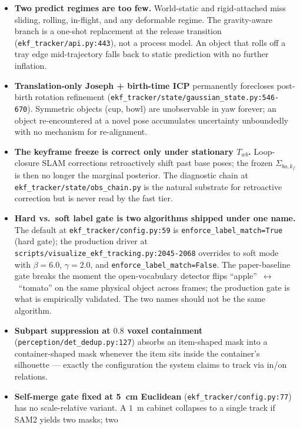 \documentclass[11pt]{article}
\begin{document}
\begin{itemize}[leftmargin=1.5em,itemsep=0pt,topsep=2pt]
\item \textbf{Two predict regimes are too few.} World-static and
  rigid-attached miss sliding, rolling, in-flight, and any deformable
  regime. The gravity-aware branch is a one-shot replacement at the
  release transition (\texttt{ekf\_tracker/api.py:443}), not a process
  model. An object that rolls off a tray edge mid-trajectory falls back
  to static prediction with no further inflation.
\item \textbf{Translation-only Joseph + birth-time ICP} permanently
  forecloses post-birth rotation refinement
  (\texttt{ekf\_tracker/state/gaussian\_state.py:546-670}).
  Symmetric objects (cup, bowl) are unobservable in yaw forever; an object
  re-encountered at a novel pose accumulates uncertainty unboundedly with
  no mechanism for re-alignment.
\item \textbf{The keyframe freeze is correct only under stationary
  $T_{wb}$.} Loop-closure SLAM corrections retroactively shift past base
  poses; the frozen $\Sigma_{bo,k_f}$ is then no longer the marginal
  posterior. The diagnostic chain at
  \texttt{ekf\_tracker/state/obs\_chain.py} is the natural substrate for
  retroactive correction but is never read by the fast tier.
\item \textbf{Hard vs.\ soft label gate is two algorithms shipped under
  one name.} The default at \texttt{ekf\_tracker/config.py:59} is
  \texttt{enforce\_label\_match=True} (hard gate); the production driver
  at \texttt{scripts/visualize\_ekf\_tracking.py:2045-2068} overrides to
  soft mode with $\beta{=}6.0$, $\gamma{=}2.0$, and
  \texttt{enforce\_label\_match=False}. The paper-baseline gate breaks the
  moment the open-vocabulary detector flips ``apple''~$\leftrightarrow$~``tomato''
  on the same physical object across frames; the production gate is what
  is empirically validated. The two names should not be the same algorithm.
\item \textbf{Subpart suppression at $0.8$ voxel containment}
  (\texttt{perception/det\_dedup.py:127}) absorbs an item-shaped mask into
  a container-shaped mask whenever the item sits inside the container's
  silhouette --- exactly the configuration the system claims to track via
  in/on relations.
\item \textbf{Self-merge gate fixed at 5~cm Euclidean}
  (\texttt{ekf\_tracker/config.py:77}) has no scale-relative variant. A
  $1$~m cabinet collapses to a single track if SAM2 yields two masks; two

\end{itemize}
\end{document}
